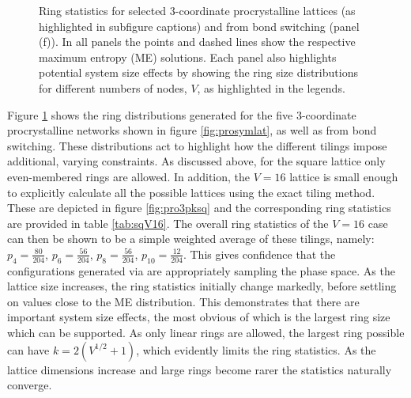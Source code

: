 \begin{figure}[btp]
     \caption{Ring statistics for selected 3\--coordinate procrystalline lattices (as highlighted in subfigure captions) and from bond switching (panel (f)). In  all  panels  the  points  and  dashed  lines show the respective maximum entropy (ME) solutions.  Each panel also highlights potential system size effects by showing the ring size distributions for different numbers of nodes, $V$, as highlighted in the legends.}
     \label{fig:pro3pk}
\end{figure}

Figure \ref{fig:pro3pk} shows the ring distributions generated for the five 3\--coordinate procrystalline networks shown in figure \ref{fig:prosymlat}, as well as from bond switching.
These distributions act to highlight how the different tilings impose additional, varying constraints.
As discussed above, for the square lattice only even\--membered rings are allowed.
In addition, the $V=16$ lattice is small enough to explicitly calculate all the possible lattices using the exact tiling method.
These are depicted in figure \ref{fig:pro3pksq} and the corresponding ring statistics are provided in table \ref{tab:sqV16}.
The overall ring statistics of the $V=16$ case can then be shown to be a simple weighted average of these tilings, namely: $p_4=\frac{80}{204}$, $p_6=\frac{56}{204}$, $p_8=\frac{56}{204}$, $p_{10}=\frac{12}{204}$.
This gives confidence that the configurations generated via \mc{} are appropriately sampling the phase space.
As the lattice size increases, the ring statistics initially change markedly, before settling on values close to the ME distribution.
This demonstrates that there are important system size effects, the most obvious of which is the largest ring size which can be supported.
As only linear rings are allowed, the largest ring possible can have $k=2\left(V^{1/2}+1\right)$, which evidently limits the ring statistics.
As the lattice dimensions increase and large rings become rarer the statistics naturally converge.

